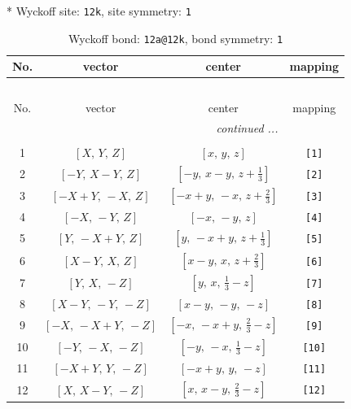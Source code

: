 \documentclass[fleqn,8pt]{jsarticle}
\begin{document}
* Wyckoff site: {\tt 12k}, site symmetry: {\tt 1}
\renewcommand{\arraystretch}{1.2}
\begin{longtable}{cccc}
\caption{Wyckoff bond: {\tt 12a@12k}, bond symmetry: {\tt 1}}
 \\
 \hline \hline
No. & vector & center & mapping \\ \hline \endfirsthead

\multicolumn{3}{l}{\tablename\ \thetable{}} \\
 \hline \hline
No. & vector & center & mapping \\ \hline \endhead

 \hline \hline
\multicolumn{3}{r}{\footnotesize\it continued ...} \\ \endfoot

 \hline \hline
\multicolumn{3}{r}{} \\ \endlastfoot

1 & $\left[ X,\, Y,\, Z \right]$ & $\left[ x,\, y,\, z \right]$ & {\tt [1]} \\ \hline
2 & $\left[ - Y,\, X - Y,\, Z \right]$ & $\left[ - y,\, x - y,\, z + \frac{1}{3} \right]$ & {\tt [2]} \\ \hline
3 & $\left[ - X + Y,\, - X,\, Z \right]$ & $\left[ - x + y,\, - x,\, z + \frac{2}{3} \right]$ & {\tt [3]} \\ \hline
4 & $\left[ - X,\, - Y,\, Z \right]$ & $\left[ - x,\, - y,\, z \right]$ & {\tt [4]} \\ \hline
5 & $\left[ Y,\, - X + Y,\, Z \right]$ & $\left[ y,\, - x + y,\, z + \frac{1}{3} \right]$ & {\tt [5]} \\ \hline
6 & $\left[ X - Y,\, X,\, Z \right]$ & $\left[ x - y,\, x,\, z + \frac{2}{3} \right]$ & {\tt [6]} \\ \hline
7 & $\left[ Y,\, X,\, - Z \right]$ & $\left[ y,\, x,\, \frac{1}{3} - z \right]$ & {\tt [7]} \\ \hline
8 & $\left[ X - Y,\, - Y,\, - Z \right]$ & $\left[ x - y,\, - y,\, - z \right]$ & {\tt [8]} \\ \hline
9 & $\left[ - X,\, - X + Y,\, - Z \right]$ & $\left[ - x,\, - x + y,\, \frac{2}{3} - z \right]$ & {\tt [9]} \\ \hline
10 & $\left[ - Y,\, - X,\, - Z \right]$ & $\left[ - y,\, - x,\, \frac{1}{3} - z \right]$ & {\tt [10]} \\ \hline
11 & $\left[ - X + Y,\, Y,\, - Z \right]$ & $\left[ - x + y,\, y,\, - z \right]$ & {\tt [11]} \\ \hline
12 & $\left[ X,\, X - Y,\, - Z \right]$ & $\left[ x,\, x - y,\, \frac{2}{3} - z \right]$ & {\tt [12]} \\
\end{longtable}
\end{document}
